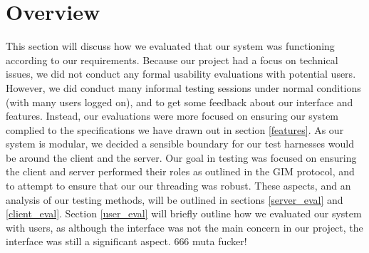 \section{Overview}

This section will discuss how we evaluated that our system was functioning according to our requirements. Because our project had a focus on technical issues, we did not conduct any formal usability evaluations with potential users. However, we did conduct many informal testing sessions under normal conditions (with many users logged on), and to get some feedback about our interface and features. Instead, our evaluations were more focused on ensuring our system complied to the specifications we have drawn out in section \ref{features}. As our system is modular, we decided a sensible boundary for our test harnesses would be around the client and the server. Our goal in testing was focused on ensuring the client and server performed their roles as outlined in the GIM protocol, and to attempt to ensure that our our threading was robust.  These aspects, and an analysis of our testing methods, will be outlined in sections \ref{server_eval} and \ref{client_eval}. Section \ref{user_eval} will briefly outline how we evaluated our system with users, as although the interface was not the main concern in our project, the interface was still a significant aspect. 666 muta fucker!

